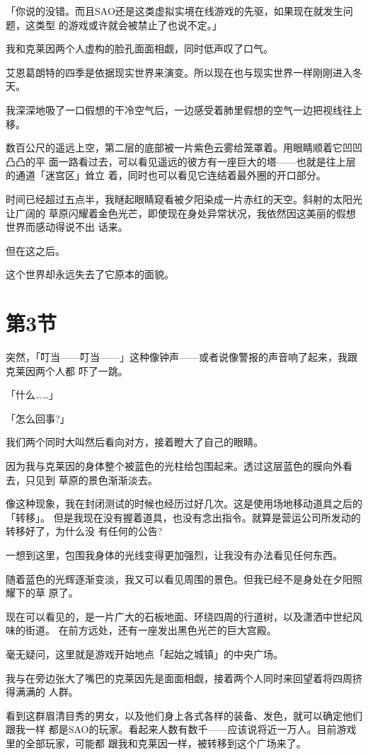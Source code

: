\documentclass[11pt]{book}
\begin{document}
「你说的没错。而且SAO还是这类虚拟实境在线游戏的先驱，如果现在就发生问题，这类型
的游戏或许就会被禁止了也说不定。」

我和克莱因两个人虚构的脸孔面面相觑，同时低声叹了口气。

艾恩葛朗特的四季是依据现实世界来演变。所以现在也与现实世界一样刚刚进入冬天。

我深深地吸了一口假想的干冷空气后，一边感受着肺里假想的空气一边把视线往上移。

数百公尺的遥远上空，第二层的底部被一片紫色云雾给笼罩着。用眼睛顺着它凹凹凸凸的平
面一路看过去，可以看见遥远的彼方有一座巨大的塔——也就是往上层的通道「迷宫区」耸立
着，同时也可以看见它连结着最外圈的开口部分。

时间已经超过五点半，我瞇起眼睛窥看被夕阳染成一片赤红的天空。斜射的太阳光让广阔的
草原闪耀着金色光芒，即使现在身处异常状况，我依然因这美丽的假想世界而感动得说不出
话来。

但在这之后。

这个世界却永远失去了它原本的面貌。
\section{第3节}
\label{sec:org8cc5c40}
突然，「叮当——叮当——」这种像钟声——或者说像警报的声音响了起来，我跟克莱因两个人都
吓了一跳。

「什么……」

「怎么回事?」

我们两个同时大叫然后看向对方，接着瞪大了自己的眼睛。

因为我与克莱因的身体整个被蓝色的光柱给包围起来。透过这层蓝色的膜向外看去，只见到
草原的景色渐渐淡去。

像这种现象，我在封闭测试的时候也经历过好几次。这是使用场地移动道具之后的「转移」。
但是我现在没有握着道具，也没有念出指令。就算是营运公司所发动的转移好了，为什么没
有任何的公告?

一想到这里，包围我身体的光线变得更加强烈，让我没有办法看见任何东西。

随着蓝色的光辉逐渐变淡，我又可以看见周围的景色。但我已经不是身处在夕阳照耀下的草
原了。

现在可以看见的，是一片广大的石板地面、环绕四周的行道树，以及潇洒中世纪风味的街道。
在前方远处，还有一座发出黑色光芒的巨大宫殿。

毫无疑问，这里就是游戏开始地点「起始之城镇」的中央广场。

我与在旁边张大了嘴巴的克莱因先是面面相觑，接着两个人同时来回望着将四周挤得满满的
人群。

看到这群眉清目秀的男女，以及他们身上各式各样的装备、发色，就可以确定他们跟我一样
都是SAO的玩家。看起来人数有数千——应该说将近一万人。目前游戏里的全部玩家，可能都
跟我和克莱因一样，被转移到这个广场来了。
\end{document}

